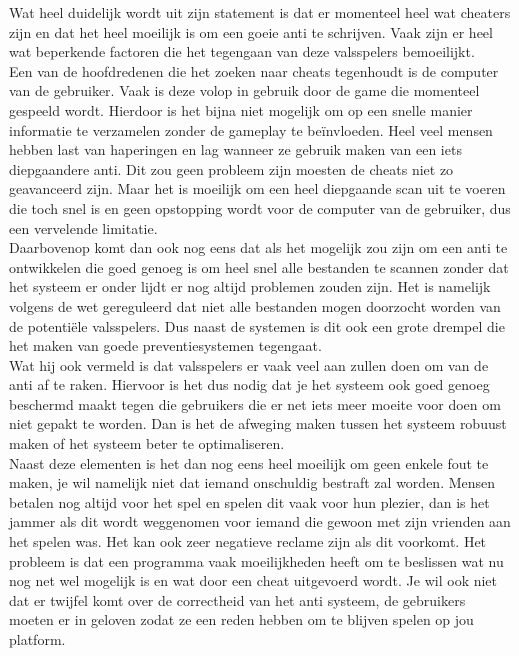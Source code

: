\documentclass[pdftex,a4paper,12pt,twoside]{report}
\begin{document}
Wat heel duidelijk wordt uit zijn statement is dat er momenteel heel wat \gls{cheat}ers zijn en dat het heel moeilijk is om een goeie \gls{anti} te schrijven. Vaak zijn er heel wat beperkende factoren die het tegengaan van deze valsspelers bemoeilijkt. 
\\

Een van de hoofdredenen die het zoeken naar \gls{cheat}s tegenhoudt is de computer van de gebruiker. Vaak is deze volop in gebruik door de game die momenteel gespeeld wordt. Hierdoor is het bijna niet mogelijk om op een snelle manier informatie te verzamelen zonder de gameplay te beïnvloeden. Heel veel mensen hebben last van haperingen en \gls{lag} wanneer ze gebruik maken van een iets diepgaandere \gls{anti}.
Dit zou geen probleem zijn moesten de cheats niet zo geavanceerd zijn. Maar het is moeilijk om een heel diepgaande scan uit te voeren die toch snel is en geen opstopping wordt voor de computer van de gebruiker, dus een vervelende limitatie. 
\\

Daarbovenop komt dan ook nog eens dat als het mogelijk zou zijn om een \gls{anti} te ontwikkelen die goed genoeg is om heel snel alle bestanden te scannen zonder dat het systeem er onder lijdt er nog altijd problemen zouden zijn. Het is namelijk volgens de wet gereguleerd dat niet alle bestanden mogen doorzocht worden van de potentiële valsspelers. Dus naast de systemen is dit ook een grote drempel die het maken van goede preventiesystemen tegengaat.
\\

Wat hij ook vermeld is dat valsspelers er vaak veel aan zullen doen om van de \gls{anti} af te raken. Hiervoor is het dus nodig dat je het systeem ook goed genoeg beschermd maakt tegen die gebruikers die er net iets meer moeite voor doen om niet gepakt te worden. Dan is het de afweging maken tussen het systeem robuust maken of het systeem beter te optimaliseren.
\\

Naast deze elementen is het dan nog eens heel moeilijk om geen enkele fout te maken, je wil namelijk niet dat iemand onschuldig bestraft zal worden. Mensen betalen nog altijd voor het spel en spelen dit vaak voor hun plezier, dan is het jammer als dit wordt weggenomen voor iemand die gewoon met zijn vrienden aan het spelen was. Het kan ook zeer negatieve reclame zijn als dit voorkomt. Het probleem is dat een programma vaak moeilijkheden heeft om te beslissen wat nu nog net wel mogelijk is en wat door een \gls{cheat} uitgevoerd wordt. Je wil ook niet dat er twijfel komt over de correctheid van het \gls{anti} systeem, de gebruikers moeten er in geloven zodat ze een reden hebben om te blijven spelen op jou platform.
\\
\end{document}
